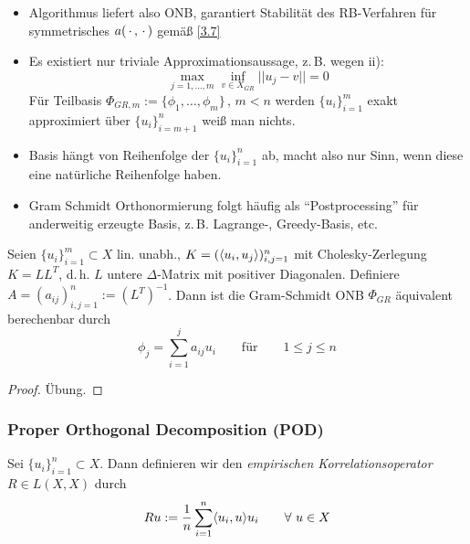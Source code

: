 \begin{bem} \beginwithlistbem
	\begin{itemize}
		\item Algorithmus liefert also ONB, garantiert Stabilität des RB-Verfahren für symmetrisches $a(\,\cdot\,,\,\cdot\,)$ gemäß \ref{3.7}
		\item Es existiert nur triviale Approximationsaussage, z.\,B. wegen ii):
		\[
			\max_{j=1,\dots,m} \inf_{v \in X_{GR}} ||u_j - v|| = 0
		\]
		Für Teilbasis $\Phi_{GR,m} := \{\phi_1,\dots,\phi_m\}\, , \, m < n$ werden $\{u_i\}_{i=1}^m$ exakt approximiert über $\{u_i\}_{i=m+1}^n$ weiß man nichts.
		\item Basis hängt von Reihenfolge der $\{u_i\}_{i=1}^n$ ab, macht also nur Sinn, wenn diese eine natürliche Reihenfolge haben.
		\item Gram Schmidt Orthonormierung folgt häufig als ``Postprocessing'' für anderweitig erzeugte Basis, z.\,B. Lagrange-, Greedy-Basis, etc.
	\end{itemize}
\end{bem}

\begin{satz}
	Seien $\{u_i\}_{i=1}^m \subset X$ lin. unabh., $K = (\langle u_i, u_j \rangle)_{i,j=1}^n$ mit Cholesky-Zerlegung $K=LL^T$, d.\,h. $L$ untere $\Delta$-Matrix mit positiver Diagonalen. Definiere $A=(a_{ij})_{i,j=1}^n := (L^T)^{-1}$. Dann ist die Gram-Schmidt ONB $\Phi_{GR}$ äquivalent berechenbar durch
	\[
		\phi_j = \sum\limits_{i=1}^j a_{ij} u_i \qquad \text{für}	\qquad 1 \leq j \leq n
	\]
\begin{proof}
	Übung.
\end{proof}
\end{satz}

\subsubsection*{Proper Orthogonal Decomposition (POD)}

\begin{defn}[Korrelationsoperator]
\label{3.45}
Sei $\{u_i\}_{i=1}^n \subset X$. Dann definieren wir den \emph{empirischen Korrelationsoperator} $R \in L(X,X)$ durch
\[
	Ru := \frac{1}{n} \sum\limits_{i=1}^n \langle u_i, u \rangle u_i \qquad \forall \,\, u \in X
\]
\end{defn}

